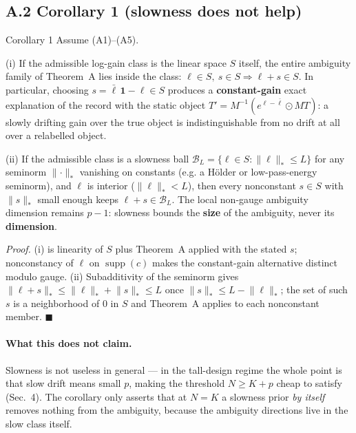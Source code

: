 \subsection{A.2 Corollary 1 (slowness does not help)}

\begin{namedthm}{Corollary 1}
Assume (A1)--(A5).

(i) If the admissible log-gain class is the linear space $S$ itself, the entire ambiguity family of Theorem~A lies inside the class: $\ell \in S,\ s \in S \Rightarrow \ell + s \in S$. In particular, choosing $s = \bar\ell\,\mathbf 1 - \ell \in S$ produces a \textbf{constant-gain} exact explanation of the record with the static object $T' = M^{-1}(e^{\ell - \bar\ell}\odot MT)$: a slowly drifting gain over the true object is indistinguishable from no drift at all over a relabelled object.

(ii) If the admissible class is a slowness ball $\mathcal B_L = \{\ell \in S : \lVert \ell \rVert_* \le L\}$ for any seminorm $\lVert\cdot\rVert_*$ vanishing on constants (e.g. a H\"older or low-pass-energy seminorm), and $\ell$ is interior ($\lVert\ell\rVert_* < L$), then every nonconstant $s \in S$ with $\lVert s\rVert_*$ small enough keeps $\ell + s \in \mathcal B_L$. The local non-gauge ambiguity dimension remains $p - 1$: slowness bounds the \textbf{size} of the ambiguity, never its \textbf{dimension}.
\end{namedthm}

\noindent\emph{Proof.} (i) is linearity of $S$ plus Theorem~A applied with the stated $s$; nonconstancy of $\ell$ on $\operatorname{supp}(c)$ makes the constant-gain alternative distinct modulo gauge. (ii) Subadditivity of the seminorm gives $\lVert \ell + s\rVert_* \le \lVert\ell\rVert_* + \lVert s\rVert_* \le L$ once $\lVert s\rVert_* \le L - \lVert\ell\rVert_*$; the set of such $s$ is a neighborhood of $0$ in $S$ and Theorem~A applies to each nonconstant member. \hfill$\blacksquare$

\paragraph{What this does not claim.} Slowness is not useless in general --- in the tall-design regime the whole point is that slow drift means small $p$, making the threshold $N \ge K + p$ cheap to satisfy (Sec.~4). The corollary only asserts that at $N = K$ a slowness prior \emph{by itself} removes nothing from the ambiguity, because the ambiguity directions live in the slow class itself.

